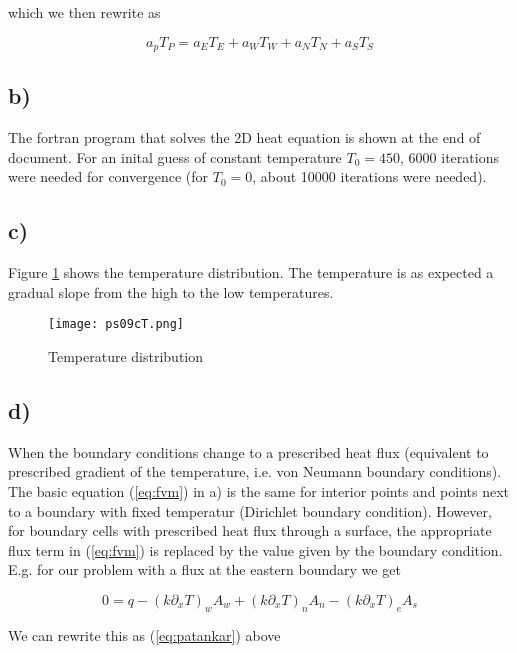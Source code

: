 \documentclass{article}
\begin{document}
which we then rewrite as

\begin{equation}
\label{eq:patankar}
a_p T_P = a_E T_E + a_W T_W + a_N T_N + a_S T_S
\end{equation}


\subsection{b)}

The fortran program that solves the 2D heat equation is shown at the end of document. For an inital guess of constant temperature $T_0 = 450$, 6000 iterations were needed for convergence (for $T_0 = 0$, about 10000 iterations were needed).

\subsection{c)}

Figure \ref{fig:tdist} shows the temperature distribution. The temperature is as expected a gradual slope from the high to the low temperatures. 

\begin{figure}
\texttt{[image: ps09cT.png]}
\caption{Temperature distribution}
\label{fig:tdist}
\end{figure}

\subsection{d)}
When the boundary conditions change to a prescribed heat flux (equivalent to prescribed gradient of the temperature, i.e. von Neumann boundary conditions). The basic equation (\ref{eq:fvm}) in a) is the same for interior points and points next to a boundary with fixed temperatur (Dirichlet boundary condition). However, for boundary cells with prescribed heat flux through a surface, the appropriate flux term in (\ref{eq:fvm}) is replaced by the value given by the boundary condition. E.g. for our problem with a flux at the eastern boundary we get

\begin{equation}
\label{eq:fvm_vn}
0 = q - (k \partial_x T)_w A_w + (k \partial_x T)_n A_n - (k \partial_x T)_e A_s
\end{equation}

We can rewrite this as (\ref{eq:patankar}) above
\end{document}
